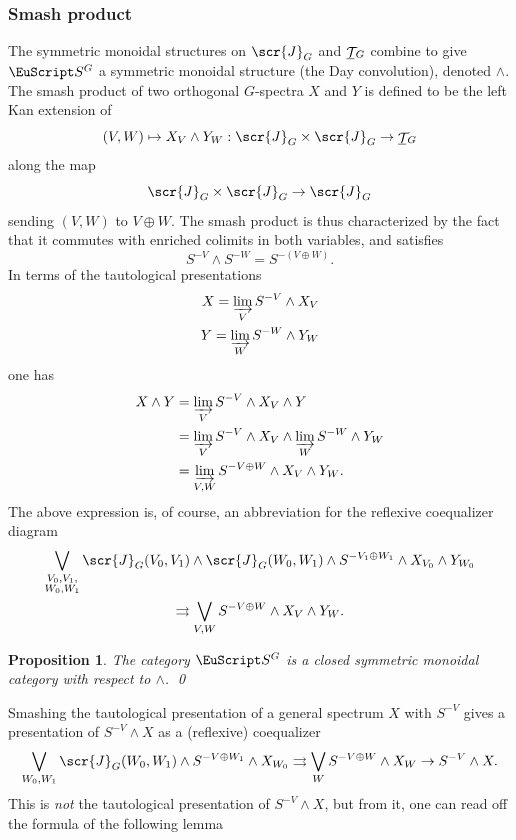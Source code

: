 \documentclass{amsart}
\newtheorem{prop}[equation]{Proposition}
\theoremstyle{definition}
\theoremstyle{remark}
\newcommand{\spectra}{\EuScript S}
\DeclareMathOperator{\spaces}{\mathcal T}
\newcommand{\icat}{\scr{J}}
\newcommand{\igcat}[1]{\icat_{#1}}
\newcommand{\gspaces}[1]{\underline{\spaces\mkern-4mu}\mkern4mu_{\!#1}}
\newcommand{\ugspectra}[1]{\spectra^{#1}}
\begin{document}
\subsubsection{Smash product}
\label{sec:smash-prod-orth}

The symmetric mon\-oid\-al structures on $\igcat G$ and $\gspaces G$
combine to give $\ugspectra G$ a symmetric monoidal structure (the Day
convolution), denoted $\wedge$.  The smash product of two orthogonal
$G$-spectra $X$ and $Y$ is defined to be the left Kan extension of
\[
(V,W)\mapsto X_{V}\wedge Y_{W}: \igcat{G}\times \igcat{G}\to
\gspaces G
\]
along the map 
\[
\igcat{G}\times\igcat{G}\to \igcat{G}
\]
sending $(V,W)$ to $V\oplus W$.  The smash product is thus
characterized by the fact that it commutes with enriched colimits in
both variables, and satisfies 
\[
S^{-V}\wedge S^{-W}= S^{-(V\oplus W)}.
\]
In terms of the tautological presentations
\begin{align*}
X=\varinjlim_{V}S^{-V}\wedge X_{V} \\
Y=\varinjlim_{W}S^{-W}\wedge Y_{W}
\end{align*}
one has
\begin{align*}
X\wedge Y &= \varinjlim_{V}S^{-V}\wedge X_{V}\wedge Y \\
          &= \varinjlim_{V}S^{-V}\wedge X_{V}\wedge \varinjlim_{W}S^{-W}\wedge Y_{W} \\
          &= \varinjlim_{V,W}S^{-V\oplus W}\wedge X_{V}\wedge Y_{W}.
\end{align*}
The above expression is, of course, an abbreviation for the
reflexive coequalizer diagram
\begin{multline*}
\bigvee_{\substack{V_{0},V_{1}, \\ W_{0},W_{1}}}
\igcat G(V_{0},V_{1})\wedge \igcat G(W_{0},W_{1})\wedge
S^{-V_{1}\oplus W_{1}}\wedge
X_{V_{0}}\wedge Y_{W_{0}}\\ \rightrightarrows
\bigvee_{V,W}S^{-V\oplus W}\wedge X_{V}\wedge Y_{W}.
\end{multline*}

\begin{prop}
\label{thm:63}
The category $\ugspectra G$ is a closed symmetric monoidal category
with respect to $\wedge$. \qed
\end{prop}

Smashing the tautological presentation of a general spectrum $X$ with
$S^{-V}$ gives a presentation of $S^{-V}\wedge X$ as a (reflexive)
coequalizer
\[
\bigvee_{W_{0},W_{1}} \igcat{G}(W_{0},W_{1})\wedge S^{-V\oplus W_{1}}\wedge
X_{W_{0}} \rightrightarrows
\bigvee_{W} S^{-V\oplus W}\wedge X_{W} \to S^{-V}\wedge X.
\]
This is {\em not} the tautological presentation of $S^{-V}\wedge X$, but
from it, one can read off the formula of the following lemma
\end{document}
